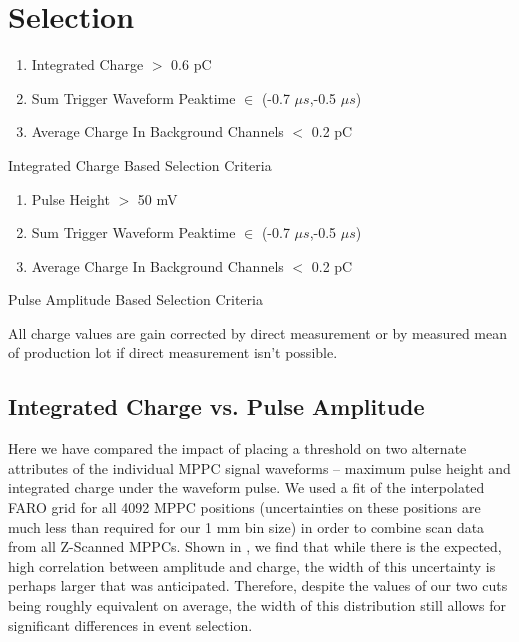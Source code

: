 \appendix
\section{Selection}
\begin{table}[H]
    \centering
    \begin{enumerate}
    \item Integrated Charge $>$ 0.6 pC
    \item Sum Trigger Waveform Peaktime $\in$ (-0.7 $\mu s$,-0.5 $\mu s$)
    \item Average Charge In Background Channels $<$ 0.2 pC
    \end{enumerate}
    \caption{Integrated Charge Based Selection Criteria}
    \label{tab:my_label}
\end{table}

\begin{table}[H]
    \centering
    \begin{enumerate}
    \item Pulse Height $>$ 50 mV
    \item Sum Trigger Waveform Peaktime $\in$ (-0.7 $\mu s$,-0.5 $\mu s$)
    \item Average Charge In Background Channels $<$ 0.2 pC
    \end{enumerate}
    \caption{Pulse Amplitude Based Selection Criteria}
    \label{tab:my_label}
\end{table}
All charge values are gain corrected by direct measurement or by measured mean of production lot if direct measurement isn't possible.

\subsection{Integrated Charge vs. Pulse Amplitude}
Here we have compared the impact of placing a threshold on two alternate attributes of the individual MPPC signal waveforms -- maximum pulse height and integrated charge under the waveform pulse. We used a fit of the interpolated FARO grid for all 4092 MPPC positions (uncertainties on these positions are much less than required for our 1 mm bin size) in order to combine scan data from all Z-Scanned MPPCs. Shown in , we find that while there is the expected, high correlation between amplitude and charge, the width of this uncertainty is perhaps larger that was anticipated. Therefore, despite the values of our two cuts being roughly equivalent on average, the width of this distribution still allows for significant differences in event selection.

